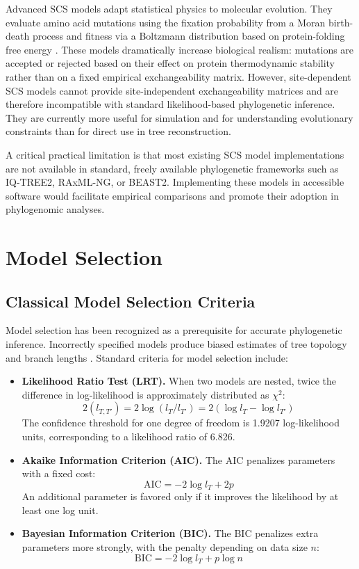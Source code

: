 Advanced SCS models adapt statistical physics to molecular evolution. They evaluate amino acid mutations using the fixation probability from a Moran birth-death process and fitness via a Boltzmann distribution based on protein-folding free energy \parencite{ferreiro2026}. These models dramatically increase biological realism: mutations are accepted or rejected based on their effect on protein thermodynamic stability rather than on a fixed empirical exchangeability matrix. However, site-dependent SCS models cannot provide site-independent exchangeability matrices and are therefore incompatible with standard likelihood-based phylogenetic inference. They are currently more useful for simulation and for understanding evolutionary constraints than for direct use in tree reconstruction.

A critical practical limitation is that most existing SCS model implementations are not available in standard, freely available phylogenetic frameworks such as IQ-TREE2, RAxML-NG, or BEAST2. Implementing these models in accessible software would facilitate empirical comparisons and promote their adoption in phylogenomic analyses.

\section{Model Selection}

\subsection{Classical Model Selection Criteria}

Model selection has been recognized as a prerequisite for accurate phylogenetic inference. Incorrectly specified models produce biased estimates of tree topology and branch lengths \parencite{buckley2002,sanderson2002,abadi2019}. Standard criteria for model selection include:

\begin{itemize}
    \item \textbf{Likelihood Ratio Test (LRT).} When two models are nested, twice the difference in log-likelihood is approximately distributed as $\chi^2$:
    $$2(l_{T,T'}) = 2\log(l_T / l_{T'}) = 2(\log l_T - \log l_{T'})$$
    The confidence threshold for one degree of freedom is 1.9207 log-likelihood units, corresponding to a likelihood ratio of 6.826.

    \item \textbf{Akaike Information Criterion (AIC).} The AIC \parencite{akaike1974} penalizes parameters with a fixed cost:
    $$\mathrm{AIC} = -2\log l_T + 2p$$
    An additional parameter is favored only if it improves the likelihood by at least one log unit.

    \item \textbf{Bayesian Information Criterion (BIC).} The BIC \parencite{schwarz1978} penalizes extra parameters more strongly, with the penalty depending on data size $n$:
    $$\mathrm{BIC} = -2\log l_T + p\log n$$
\end{itemize}

